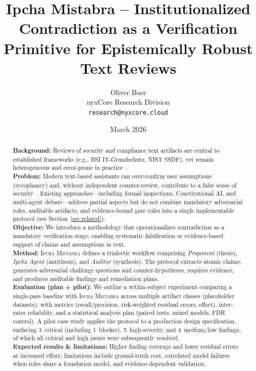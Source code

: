 \documentclass[11pt,a4paper]{article}
\title{\textbf{Ipcha Mistabra -- Institutionalized Contradiction as a Verification Primitive for Epistemically Robust Text Reviews}}
\author{Oliver Baer\\nyxCore Research Division\\\texttt{research@nyxcore.cloud}}
\date{March 2026}
\newcommand{\methodname}{\textsc{Ipcha Mistabra}}
\begin{document}
\maketitle

\begin{abstract}
\textbf{Background:}
Reviews of security and compliance text artifacts are central to established frameworks (e.g., BSI IT-Grundschutz, NIST SSDF), yet remain heterogeneous and error-prone in practice~\cite{bsi_standard_100_2,nist_sp800_218}.
\\
\textbf{Problem:}
Modern text-based assistants can over-confirm user assumptions (sycophancy) and, without independent counter-review, contribute to a false sense of security~\cite{sharma_sycophancy}.
Existing approaches---including formal inspections, Constitutional AI, and multi-agent debate---address partial aspects but do not combine mandatory adversarial roles, auditable artifacts, and evidence-bound gate rules into a single implementable protocol (see Section~\ref{sec:related}).
\\
\textbf{Objective:}
We introduce a methodology that operationalizes contradiction as a mandatory verification stage, enabling systematic falsification or evidence-based support of claims and assumptions in text.
\\
\textbf{Method:}
\methodname{} defines a trialectic workflow comprising \emph{Proponent} (thesis), \emph{Ipcha Agent} (antithesis), and \emph{Auditor} (synthesis).
The protocol extracts atomic claims, generates adversarial challenge questions and counter-hypotheses, requires evidence, and produces auditable findings and remediation plans.
\\
\textbf{Evaluation (plan + pilot):}
We outline a within-subject experiment comparing a single-pass baseline with \methodname{} across multiple artifact classes (placeholder datasets), with metrics (recall/precision, risk-weighted residual errors, effort), inter-rater reliability, and a statistical analysis plan (paired tests, mixed models, FDR control).
A pilot case study applies the protocol to a production design specification, surfacing 3~critical (including 1~blocker), 5~high-severity, and 4~medium/low findings, of which all critical and high issues were subsequently resolved.
\\
\textbf{Expected results \& limitations:}
Higher finding coverage and lower residual errors at increased effort; limitations include ground-truth cost, correlated model failures when roles share a foundation model, and evidence-dependent validation.
\end{abstract}
\end{document}
